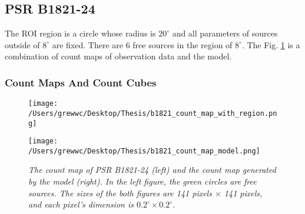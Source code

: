 \documentclass[12pt]{report}
\newcommand{\mycaption}[1]{\caption{\textit{\footnotesize #1}}}
\newcommand{\singleFig}[3]{
 \begin{figure}[!ht]
  \centering
  \texttt{[image: /Users/grewwc/Desktop/Thesis/\#1]}
  \mycaption{#3}
 \label{fig: #1}
 \end{figure}
}
\newcommand{\Notice}[1]{
  $<$\textbf{Notice}$>$#1$<$\textbf{/Notice}$>$
}
\begin{document}

            \subsection{PSR B1821-24}
              The ROI region is a circle whose radius is $20^\circ$ and all 
              parameters of sources outside of $8^\circ$ are fixed. 
              There are 6 free sources in the region of $8^\circ$. The Fig.
              \ref{fig: b1821_count_map_with_region_and_model} 
              is a combination of count maps of observation data and the model. 

              \subsubsection{Count Maps And Count Cubes}
                \begin{figure}[!ht]
                  \begin{center}
                  \begin{minipage}{0.45\textwidth}
                    \begin{center} 
                      \texttt{[image: /Users/grewwc/Desktop/Thesis/b1821\_count\_map\_with\_region.png]}
                    \end{center}
                  \end{minipage}
                  \begin{minipage}{0.45\textwidth}
                    \begin{center}
                      \texttt{[image: /Users/grewwc/Desktop/Thesis/b1821\_count\_map\_model.png]}
                    \end{center}
                  \end{minipage}
                \end{center}
                \mycaption{The count map of PSR B1821-24 (left) and the count map generated by the 
                model (right). In the left figure, the green circles are free sources. The sizes of the both 
                figures are 141 pixels $\times$ 141 pixels, and each pixel's dimension is 
                $0.2^\circ \times 0.2^\circ$.}
                \label{fig: b1821_count_map_with_region_and_model}
              \end{figure}
            
\end{document}
